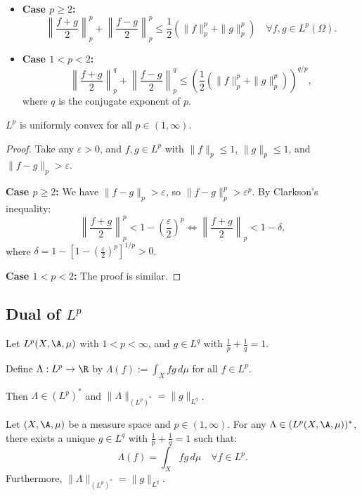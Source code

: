 \begin{itemize}
\item \textbf{Case $p \geq 2$:}
\[
\left\| \frac{f + g}{2} \right\|_p^p + \left\| \frac{f - g}{2} \right\|_p^p \leq \frac{1}{2} \left( \|f\|_p^p + \|g\|_p^p \right) \quad \forall f, g \in L^p(\Omega).
\]

\item \textbf{Case $1 < p < 2$:}
\[
\left\| \frac{f + g}{2} \right\|_p^q + \left\| \frac{f - g}{2} \right\|_p^q \leq \left( \frac{1}{2} \left( \|f\|_p^p + \|g\|_p^p \right) \right)^{q/p},
\]
where $q$ is the conjugate exponent of $p$.
\end{itemize}

\begin{proposition}
$L^p$ is uniformly convex for all $p \in (1, \infty)$.
\end{proposition}

\begin{proof}
Take any $\varepsilon > 0$, and $f, g \in L^p$ with $\|f\|_p \leq 1$, $\|g\|_p \leq 1$, and $\|f - g\|_p > \varepsilon$.

\textbf{Case $p \geq 2$:} We have $\|f - g\|_p > \varepsilon$, so $\|f - g\|_p^p > \varepsilon^p$. By Clarkson's inequality:
\[
\left\| \frac{f + g}{2} \right\|_p^p < 1 - \left( \frac{\varepsilon}{2} \right)^p \Leftrightarrow \left\| \frac{f + g}{2} \right\|_p < 1 - \delta,
\]
where $\delta = 1 - \left[ 1 - \left( \frac{\varepsilon}{2} \right)^p \right]^{1/p} > 0$.

\textbf{Case $1 < p < 2$:} The proof is similar.
\end{proof}

\subsection{Dual of $L^p$}

Let $L^p(X, \A, \mu)$ with $1 < p < \infty$, and $g \in L^q$ with $\frac{1}{p} + \frac{1}{q} = 1$.

Define $\Lambda : L^p \to \R$ by $\Lambda(f) := \int_X fg \, d\mu$ for all $f \in L^p$.

Then $\Lambda \in (L^p)^*$ and $\|\Lambda\|_{(L^p)^*} = \|g\|_{L^q}$.

\begin{theorem}
Let $(X, \A, \mu)$ be a measure space and $p \in (1, \infty)$. For any $\Lambda \in (L^p(X, \A, \mu))^*$, there exists a unique $g \in L^q$ with $\frac{1}{p} + \frac{1}{q} = 1$ such that:
\[
\Lambda(f) = \int_X fg \, d\mu \quad \forall f \in L^p.
\]
Furthermore, $\|\Lambda\|_{(L^p)^*} = \|g\|_{L^q}$.
\end{theorem}

